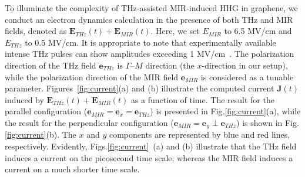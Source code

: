 To illuminate the complexity of THz-assisted MIR-induced \gls{HHG} in graphene, we conduct an electron dynamics calculation in the presence of both THz and MIR fields, denoted as $\mathbf E_{THz}(t) + \mathbf E_{MIR}(t)$. Here, we set $E_{MIR}$ to 6.5 MV/cm and $E_{THz}$ to 0.5 MV/cm. It is appropriate to note that experimentally available intense THz pulses can show amplitudes exceeding 1 MV/cm~\cite{10.1063/1.3560062}. The polarization direction of the THz field $\mathbf e_{THz}$ is $\Gamma$--$M$ direction (the $x$-direction in our setup), while the polarization direction of the MIR field $\mathbf e_{MIR}$ is considered as a tunable parameter. Figures~\ref{fig:current}(a) and (b) illustrate the computed current $\mathbf J(t)$ induced by $\mathbf E_{THz}(t) + \mathbf E_{MIR}(t)$ as a function of time. The result for the parallel configuration ($\mathbf e_{MIR} = \mathbf e_x = \mathbf e_{THz}$) is presented in Fig.\ref{fig:current}(a), while the result for the perpendicular configuration ($\mathbf e_{MIR} = \mathbf e_y \perp \mathbf e_{THz}$) is shown in Fig.\ref{fig:current}(b). The $x$ and $y$ components are represented by blue and red lines, respectively. Evidently, Figs.\ref{fig:current}~(a) and (b) illustrate that the THz field induces a current on the picosecond time scale, whereas the MIR field induces a current on a much shorter time scale.

